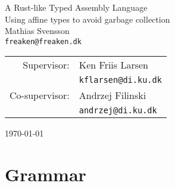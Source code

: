 




\begin{titlepage}
\begin{center}
\phantom{}
\vspace{5.0cm}
{\LARGE A Rust-like Typed Assembly Language}\\[0.5cm]
{\Large Using affine types to avoid garbage collection}\\[1.0cm]
{\large Mathias Svensson} \\
\texttt{freaken@freaken.dk} \\[0.8cm]
\begin{tabular}{rl}
Supervisor: & {\large Ken Friis Larsen} \\
            & \texttt{kflarsen@di.ku.dk} \\[0.5cm]
Co-supervisor: & {\large Andrzej Filinski} \\
               & \texttt{andrzej@di.ku.dk}
\end{tabular}

\vfill
{\large \today}
\end{center}
\end{titlepage}

\newpage
\tableofcontents
\newpage

\section{Grammar}

\begin{align*}

\end{align*}


